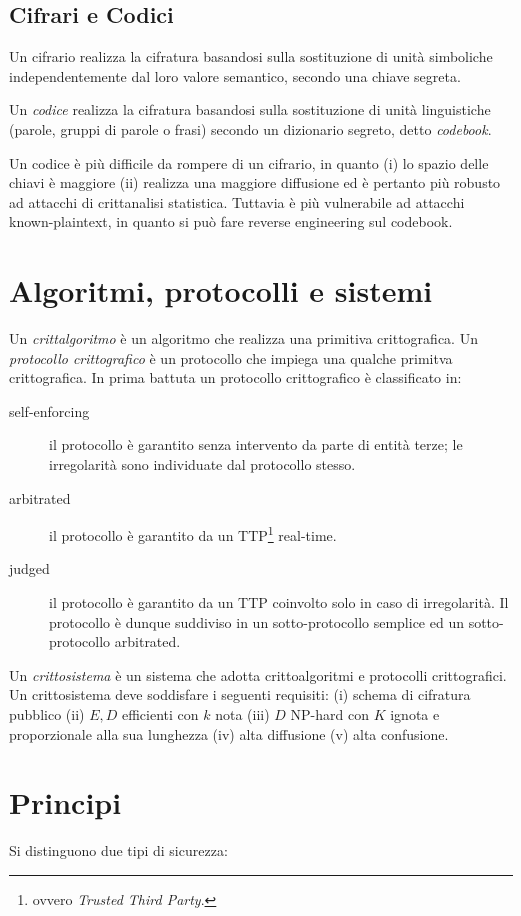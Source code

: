 \subsection{Cifrari e Codici}
Un cifrario realizza la cifratura basandosi sulla sostituzione di unità simboliche independentemente dal loro valore semantico, secondo una chiave segreta.

Un \textit{codice} realizza la cifratura basandosi sulla sostituzione di unità linguistiche (parole, gruppi di parole o frasi) secondo un dizionario segreto, detto \textit{codebook}.

Un codice è più difficile da rompere di un cifrario, in quanto
(i) lo spazio delle chiavi è maggiore
(ii) realizza una maggiore diffusione ed è pertanto più robusto ad attacchi di crittanalisi statistica.
Tuttavia è più vulnerabile ad attacchi known-plaintext, in quanto si può fare reverse engineering sul codebook.


\section{Algoritmi, protocolli e sistemi}
Un \textit{crittalgoritmo} è un algoritmo che realizza una primitiva crittografica.
Un \textit{protocollo crittografico} è un protocollo che impiega una qualche primitva crittografica. In prima battuta un protocollo crittografico è classificato in:
\begin{description}
  \item[self-enforcing] il protocollo è garantito senza intervento da parte di entità terze; le irregolarità sono individuate dal protocollo stesso.
  \item[arbitrated] il protocollo è garantito da un TTP\footnote{ovvero \textit{Trusted Third Party}.} real-time.
  \item[judged] il protocollo è garantito da un TTP coinvolto solo in caso di irregolarità. Il protocollo è dunque suddiviso in un sotto-protocollo semplice ed un sotto-protocollo arbitrated.
\end{description}

Un \textit{crittosistema} è un sistema che adotta crittoalgoritmi e protocolli crittografici. 
Un crittosistema deve soddisfare i seguenti requisiti:
(i) schema di cifratura pubblico
(ii) $E,D$ efficienti con $k$ nota
(iii) $D$ NP-hard con $K$ ignota e proporzionale alla sua lunghezza
(iv) alta diffusione
(v) alta confusione.


\section{Principi}
Si distinguono due tipi di sicurezza:

